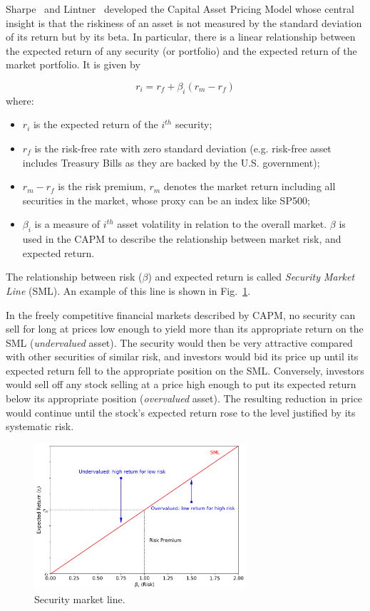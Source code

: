Sharpe~\cite{bib:capm_sharpe} and Lintner~\cite{bib:capm_lintner} developed the Capital Asset Pricing Model whose central insight is that the riskiness of an asset is not measured by the standard deviation of its return but by its beta. In particular, there is a linear relationship between the expected return of any security (or portfolio) and the expected return of the market portfolio. It is given by

\begin{equation}
	r_i = r_f + \beta_i(r_m-r_f)
	\label{eq:capm}
\end{equation}
where:
\begin{itemize}
	\item $r_i$ is the expected return of the $i^{th}$ security;
	\item $r_f$ is the risk-free rate with zero standard deviation (e.g. risk-free asset includes Treasury Bills as they are backed by the U.S. government);
	\item $r_m - r_f$ is the risk premium, $r_m$ denotes the market return including all securities in the market, whose proxy can be an index like SP500;
	\item $\beta_i$ is a measure of $i^{th}$ asset volatility in relation to the overall market. $\beta$ is used in the CAPM to describe the relationship between market risk, and expected return.
\end{itemize}

The relationship between risk ($\beta$) and expected return is called \emph{Security Market Line} (SML). An example of this line is shown in Fig.~\ref{fig:sml}.

In the freely competitive financial markets described by CAPM, no security can sell for long at prices low enough to yield more than its appropriate return on the SML (\emph{undervalued} asset). The security would then be very attractive compared with other securities of similar risk, and investors would bid its price up until its expected return fell to the appropriate position on the SML. Conversely, investors would sell off any stock selling at a price high enough to put its expected return below its appropriate position (\emph{overvalued} asset). The resulting reduction in price would continue until the stock’s expected return rose to the level justified by its systematic risk.

\begin{figure}[htb]
	\centering
	\includegraphics[width=0.7\textwidth]{figures/sml}
	\caption{Security market line.}
	\label{fig:sml}
\end{figure}

